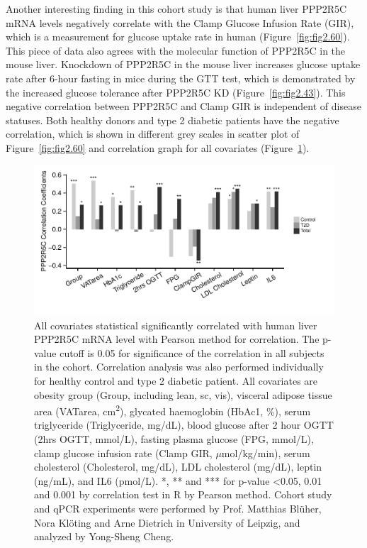 Another interesting finding in this cohort study is that human liver PPP2R5C mRNA levels negatively correlate with the Clamp Glucose Infusion Rate (GIR), which is a measurement for glucose uptake rate in human (Figure~\ref{fig:fig2.60}). This piece of data also agrees with the molecular function of PPP2R5C in the mouse liver. Knockdown of PPP2R5C in the mouse liver increases glucose uptake rate after 6-hour fasting in mice during  the GTT test, which is demonstrated by the increased glucose tolerance after PPP2R5C KD (Figure~\ref{fig:fig2.43}). This negative correlation between PPP2R5C and Clamp GIR is independent of disease statuses. Both healthy donors and type 2 diabetic patients have the negative correlation, which is shown in different grey scales in scatter plot of Figure~\ref{fig:fig2.60} and correlation graph for all covariates (Figure~\ref{fig:fig2.62}).



\begin{figure}[!t]
\centering
\includegraphics[width=1\textwidth]{figs/fig2-62 corr change.pdf}
\caption[All covariates correlated with PPP2R5C levels]{\footnotesize All covariates statistical significantly correlated with human liver PPP2R5C mRNA level with Pearson method for correlation. The p-value cutoff is 0.05 for significance of the correlation in all subjects in the cohort. Correlation analysis was also performed individually for healthy control and type 2 diabetic patient. All covariates are obesity group (Group, including lean, sc, vis), visceral adipose tissue area (VATarea, cm\textsuperscript{2}), glycated haemoglobin (HbAc1, \%), serum triglyceride (Triglyceride, mg/dL), blood glucose after 2 hour OGTT (2hrs OGTT, mmol/L), fasting plasma glucose (FPG, mmol/L), clamp glucose infusion rate (Clamp GIR, $\mu$mol/kg/min), serum cholesterol (Cholesterol, mg/dL), LDL cholesterol (mg/dL), leptin (ng/mL), and IL6 (pmol/L). *, ** and *** for p-value <0.05, 0.01 and 0.001 by correlation test in R by Pearson method. Cohort study and qPCR experiments were performed by Prof. Matthias Bl\"uher, Nora Kl\"oting and Arne Dietrich in University of Leipzig, and analyzed by Yong-Sheng Cheng.}
\label{fig:fig2.62}
\end{figure}

